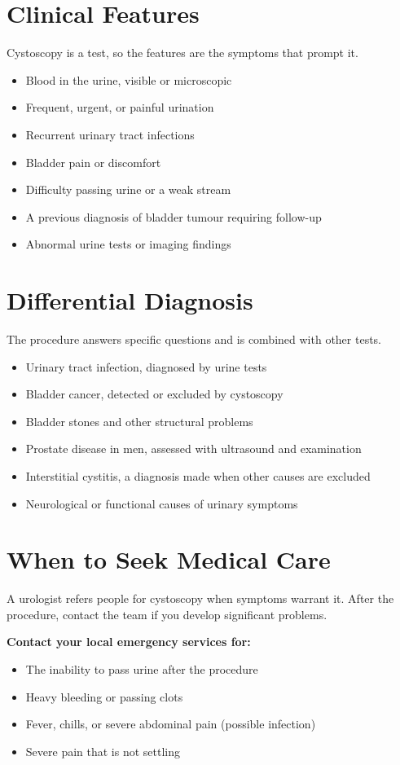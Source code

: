 \section*{Clinical Features}
Cystoscopy is a test, so the features are the symptoms that prompt it.

\begin{itemize}
    \item Blood in the urine, visible or microscopic
    \item Frequent, urgent, or painful urination
    \item Recurrent urinary tract infections
    \item Bladder pain or discomfort
    \item Difficulty passing urine or a weak stream
    \item A previous diagnosis of bladder tumour requiring follow-up
    \item Abnormal urine tests or imaging findings
\end{itemize}

\section*{Differential Diagnosis}
The procedure answers specific questions and is combined with other tests.

\begin{itemize}
    \item Urinary tract infection, diagnosed by urine tests
    \item Bladder cancer, detected or excluded by cystoscopy
    \item Bladder stones and other structural problems
    \item Prostate disease in men, assessed with ultrasound and examination
    \item Interstitial cystitis, a diagnosis made when other causes are excluded
    \item Neurological or functional causes of urinary symptoms
\end{itemize}

\section*{When to Seek Medical Care}
A urologist refers people for cystoscopy when symptoms warrant it. After the procedure, contact the team if you develop significant problems.

\textbf{Contact your local emergency services for:}
\begin{itemize}
    \item The inability to pass urine after the procedure
    \item Heavy bleeding or passing clots
    \item Fever, chills, or severe abdominal pain (possible infection)
    \item Severe pain that is not settling
\end{itemize}

